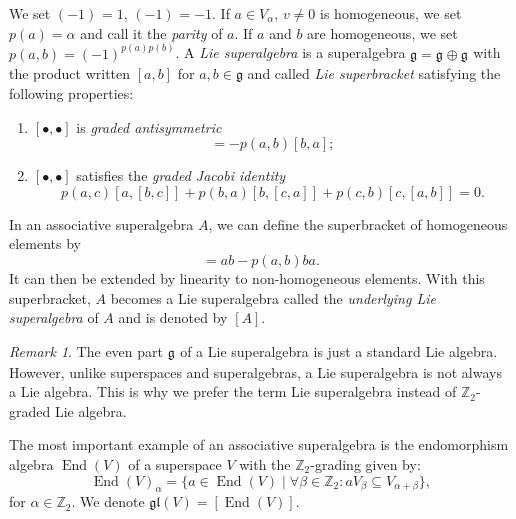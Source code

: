 \documentclass[a4paper, 12pt, reqno]{amsart}
\theoremstyle{remark}
\newtheorem{remark}[theorem]{Remark}
\numberwithin{equation}{subsection}
\DeclareMathOperator{\End}{End}
\DeclareMathOperator{\zero}{\overline{0}}
\DeclareMathOperator{\one}{\overline{1}}
\begin{document}
We set $(-1)^{\zero} = 1$, $(-1)^{\one} = -1$.
If $a\in V_\alpha$, $v\neq 0$ is homogeneous, we set $p(a) = \alpha$ and call it the \emph{parity} of $a$.
If $a$ and $b$ are homogeneous, we set $p(a, b) = (-1)^{p(a)p(b)}$.
A \emph{Lie superalgebra} is a superalgebra $\mathfrak{g} = \mathfrak{g}_{\zero} \oplus \mathfrak{g}_{\one}$ with the product written $[a, b]$ for $a, b \in \mathfrak{g}$ and called \emph{Lie superbracket} satisfying the following properties:
\begin{enumerate}[label = (\alph*)]
\item $[\bullet, \bullet]$ is \emph{graded antisymmetric}
  \begin{equation*}
    [a, b] = -p(a, b)[b, a];
  \end{equation*}
\item $[\bullet, \bullet]$ satisfies the \emph{graded Jacobi identity}
  \begin{equation*}
    p(a, c)[a, [b, c]] + p(b, a)[b, [c, a]] + p(c, b)[c, [a, b]] = 0.
  \end{equation*}
\end{enumerate}

In an associative superalgebra $A$, we can define the superbracket of homogeneous elements by
\begin{equation*}
  [a, b] = ab - p(a, b)ba.
\end{equation*}
It can then be extended by linearity to non-homogeneous elements.
With this superbracket, $A$ becomes a Lie superalgebra called the \emph{underlying Lie superalgebra} of $A$ and is denoted by $[A]$.

\begin{remark}
  \label{rmk:1}
  The even part $\mathfrak{g}_{\zero}$ of a Lie superalgebra is just a standard Lie algebra.
  However, unlike superspaces and superalgebras, a Lie superalgebra is not always a Lie algebra.
  This is why we prefer the term Lie superalgebra instead of $\mathbb{Z}_2$-graded Lie algebra.
\end{remark}

The most important example of an associative superalgebra is the endomorphism algebra $\End(V)$ of a superspace $V$ with the $\mathbb{Z}_2$-grading given by:
\begin{equation*}
  \End(V)_{\alpha} = \{a \in \End(V) \mid \forall \beta \in \mathbb{Z}_2: aV_\beta \subseteq V_{\alpha + \beta}\},
\end{equation*}
for $\alpha \in \mathbb{Z}_2$.
We denote $\mathfrak{gl}(V) = [\End(V)]$.
\end{document}

